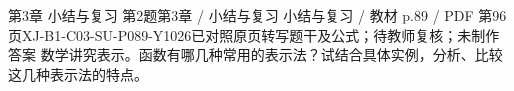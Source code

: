 \par\noindent\begin{minipage}{\linewidth}
\begin{bankitem}{第3章 小结与复习 第2题}{第3章 / 小结与复习 小结与复习 / 教材 p.89 / PDF 第96页}{XJ-B1-C03-SU-P089-Y1026}{已对照原页转写题干及公式；待教师复核；未制作答案}
数学讲究表示。函数有哪几种常用的表示法？试结合具体实例，分析、比较这几种表示法的特点。
\end{bankitem}
\end{minipage}\par\medskip
